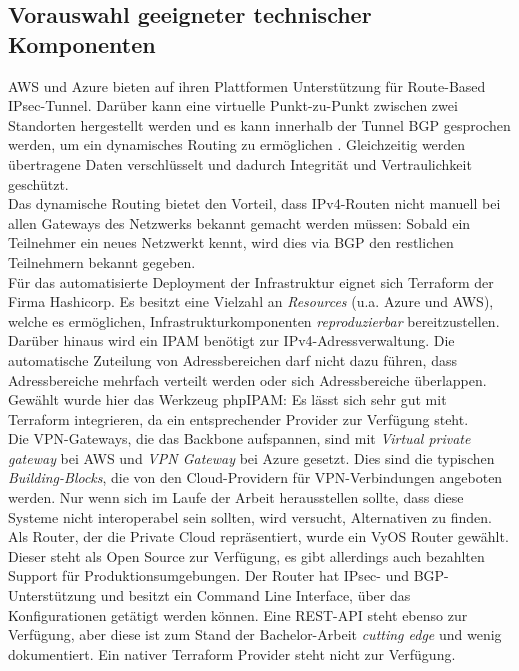 \subsection{Vorauswahl geeigneter technischer Komponenten}
AWS und Azure bieten auf ihren Plattformen Unterstützung für Route-Based \gls{IPsec}-Tunnel\cite[S.32]{awsvpn2021}. Darüber kann eine virtuelle Punkt-zu-Punkt zwischen zwei Standorten hergestellt werden und es kann innerhalb der Tunnel \gls{BGP} gesprochen werden, um ein dynamisches Routing zu ermöglichen\cite[S. 18]{AlShawi2020} \cite[S. 74-79]{Toroman2019}. Gleichzeitig werden übertragene Daten verschlüsselt und dadurch Integrität und Vertraulichkeit geschützt.\\
Das dynamische Routing bietet den Vorteil, dass IPv4-Routen nicht manuell bei allen Gateways des Netzwerks bekannt gemacht werden müssen: Sobald ein Teilnehmer ein neues Netzwerkt kennt, wird dies via \gls{BGP} den restlichen Teilnehmern bekannt gegeben.\\
Für das automatisierte \gls{Deployment} der Infrastruktur eignet sich Terraform der Firma Hashicorp. Es besitzt eine Vielzahl an \textit{Resources} (u.a. Azure und AWS), welche es ermöglichen, Infrastrukturkomponenten \textit{reproduzierbar} bereitzustellen.\\
Darüber hinaus wird ein \gls{IPAM} benötigt zur IPv4-Adressverwaltung. Die automatische Zuteilung von Adressbereichen darf nicht dazu führen, dass Adressbereiche mehrfach verteilt werden oder sich Adressbereiche überlappen. Gewählt wurde hier das Werkzeug phpIPAM\cite{phpipam2020}: Es lässt sich sehr gut mit Terraform integrieren, da ein entsprechender Provider zur Verfügung steht\cite{phpipamtf2020}.\\
Die \gls{VPN-Gateway}s, die das Backbone aufspannen, sind mit \textit{Virtual private gateway} bei AWS und \textit{VPN Gateway} bei Azure gesetzt. Dies sind die typischen \textit{Building-Blocks}, die von den Cloud-Providern für \gls{VPN}-Verbindungen angeboten werden. Nur wenn sich im Laufe der Arbeit herausstellen sollte, dass diese Systeme nicht interoperabel sein sollten, wird versucht, Alternativen zu finden.\\
Als Router, der die Private Cloud repräsentiert, wurde ein VyOS Router gewählt. Dieser steht als Open Source zur Verfügung, es gibt allerdings auch bezahlten Support für Produktionsumgebungen. Der Router hat \gls{IPsec}- und \gls{BGP}-Unterstützung und besitzt ein Command Line Interface, über das Konfigurationen getätigt werden können. Eine REST-API steht ebenso zur Verfügung, aber diese ist zum Stand der Bachelor-Arbeit \textit{cutting edge} und wenig dokumentiert\cite{vyosapi2021}. Ein nativer Terraform Provider steht nicht zur Verfügung.
